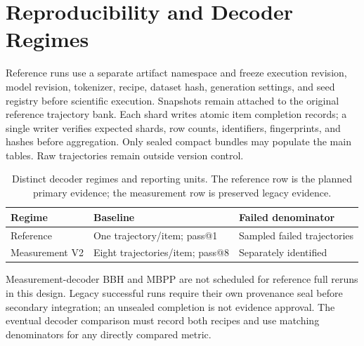 \section{Reproducibility and Decoder Regimes}

Reference runs use a separate artifact namespace and freeze execution revision,
model revision, tokenizer, recipe, dataset hash, generation settings, and seed
registry before scientific execution. Snapshots remain attached to the original
reference trajectory bank. Each shard writes atomic item completion records;
a single writer verifies expected shards, row counts, identifiers, fingerprints,
and hashes before aggregation. Only sealed compact bundles may populate the
main tables. Raw trajectories remain outside version control.

\begin{table}[h]
\caption{Distinct decoder regimes and reporting units. The reference row is the
planned primary evidence; the measurement row is preserved legacy evidence.}
\label{tab:decoder-regimes}
\centering\small
\begin{tabular}{lll}
\toprule
Regime & Baseline & Failed denominator \\
\midrule
Reference & One trajectory/item; pass@1 & Sampled failed trajectories \\
Measurement V2 & Eight trajectories/item; pass@8 & Separately identified \\
\bottomrule
\end{tabular}
\end{table}

Measurement-decoder BBH and MBPP are not scheduled for reference full reruns in
this design. Legacy successful runs require their own provenance seal before
secondary integration; an unsealed completion is not evidence approval.
The eventual decoder comparison must record both recipes and use matching
denominators for any directly compared metric.
